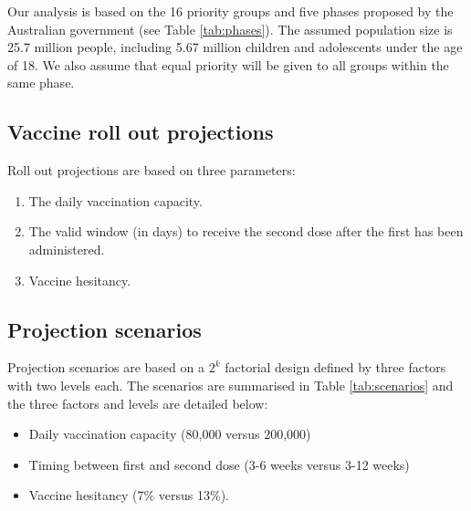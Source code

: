 \documentclass{article}
\begin{document}
Our analysis is based on the 16 priority groups and five phases proposed
by the Australian government (see Table \ref{tab:phases}). The assumed
population size is 25.7 million people, including 5.67 million children
and adolescents under the age of 18. We also assume that equal priority
will be given to all groups within the same phase.

\hypertarget{vaccine-roll-out-projections}{%
\subsection{Vaccine roll out
projections}\label{vaccine-roll-out-projections}}

Roll out projections are based on three parameters:

\begin{enumerate}
\def\labelenumi{\arabic{enumi}.}
\tightlist
\item
  The daily vaccination capacity.
\item
  The valid window (in days) to receive the second dose after the first
  has been administered.
\item
  Vaccine hesitancy.
\end{enumerate}

\hypertarget{projection-scenarios}{%
\subsection{Projection scenarios}\label{projection-scenarios}}

Projection scenarios are based on a \(2^k\) factorial design defined by
three factors with two levels each. The scenarios are summarised in
Table \ref{tab:scenarios} and the three factors and levels are detailed
below:

\begin{itemize}
\item
  Daily vaccination capacity (80,000 versus 200,000)
\item
  Timing between first and second dose (3-6 weeks versus 3-12 weeks)
\item
  Vaccine hesitancy (7\% versus 13\%).
\end{itemize}
\end{document}
